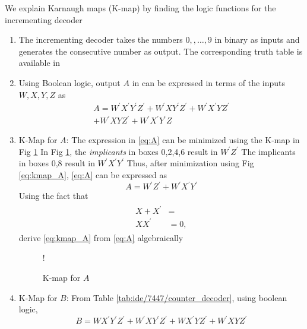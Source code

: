 We explain Karnaugh maps (K-map) by finding the
logic functions for the incrementing decoder

\begin{enumerate}[label=\arabic*.,ref=\theenumi]
%
	\item The incrementing decoder   takes the numbers $0,,\dots,9$ in binary as inputs and generates
the consecutive number as output.  The corresponding truth table is available in 
%

%
\item Using Boolean logic, output $A$  in  can be expressed in terms of the inputs $W,X,Y,Z$ as
\begin{multline}
\label{eq:A}
A = W^{\prime}X^{\prime}Y^{\prime}Z^{\prime} + W^{\prime}XY^{\prime}Z^{\prime}
+W^{\prime}X^{\prime}YZ^{\prime}
\\
+W^{\prime}XYZ^{\prime}
+W^{\prime}X^{\prime}Y^{\prime}Z
\end{multline}
\item K-Map for $A$: 
The expression in \eqref{eq:A}  can be minimized using the K-map in Fig \ref{fig:kmap_A}
In Fig \ref{fig:kmap_A},  the {\em implicants} in boxes 0,2,4,6 result in $W^{\prime}Z^{\prime}$  The implicants in
boxes 0,8 result in $W^{\prime}X^{\prime}Y^{\prime}$  Thus, after minimization using Fig \ref{eq:kmap_A},  \eqref{eq:A} can be expressed as
%
\begin{equation}
\label{eq:kmap_A}
A = W^{\prime}Z^{\prime}+W^{\prime}X^{\prime}Y^{\prime}
\end{equation}
%
Using the fact that
\begin{align}
\label{eq:boolean}
\begin{split}
X+X^{\prime} &= 
\\
XX^{\prime} &= 0,
\end{split}
\end{align}
%
derive \eqref{eq:kmap_A} from \eqref{eq:A} algebraically
%
%
%
\begin{figure}[!ht]
\resizebox {\columnwidth} {!} {

}
\caption{K-map for $A$}
\label{fig:kmap_A}
\end{figure}
%
\item K-Map for $B$:
From Table \ref{tab:ide/7447/counter_decoder}, using boolean logic,
\begin{equation}
\label{eq:B}
B = WX^{\prime}Y^{\prime}Z^{\prime} + W^{\prime}XY^{\prime}Z^{\prime}
+WX^{\prime}YZ^{\prime}
+W^{\prime}XYZ^{\prime}

\end{equation}
\end{enumerate}
